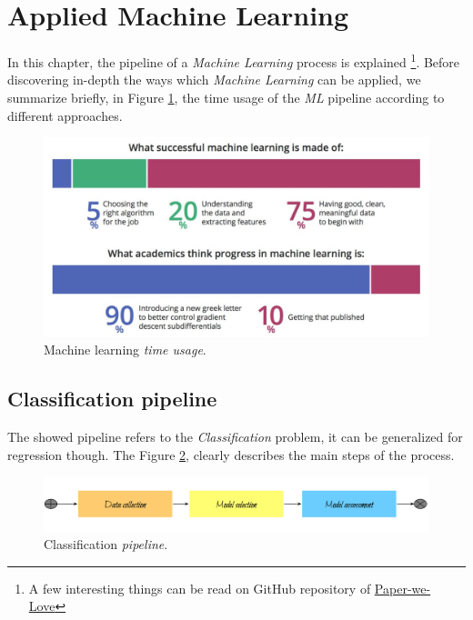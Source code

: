 

\section{Applied Machine Learning}

In this chapter, the pipeline of a {\emph{Machine Learning}} process is explained \footnote{A few interesting things can be read on GitHub repository of \href{https://github.com/papers-we-love/seattle/tree/master/useful-things-to-know-about-ml}{Paper-we-Love}}. Before discovering in-depth the ways which \emph{Machine Learning} can be applied, we summarize briefly, in Figure \ref{pic:time_usage}, the time usage of the \emph{ML} pipeline according to different approaches. 

\begin{figure}[H]%
 \centering
 \includegraphics[width=13cm]{./img/08/time_usage}
 \caption{\label{pic:time_usage} Machine learning \emph{time usage}.}
\end{figure}

\subsection{Classification pipeline}

The showed pipeline refers to the \emph{Classification} problem, it can be generalized for regression though. The Figure \ref{pic:classification_pipeline}, clearly describes the main steps of the process.

\begin{figure}[H]%
 \centering
 \includegraphics[width=13cm]{./img/08/classification_pipeline}
 \caption{\label{pic:classification_pipeline} Classification \emph{pipeline}.}
\end{figure}

